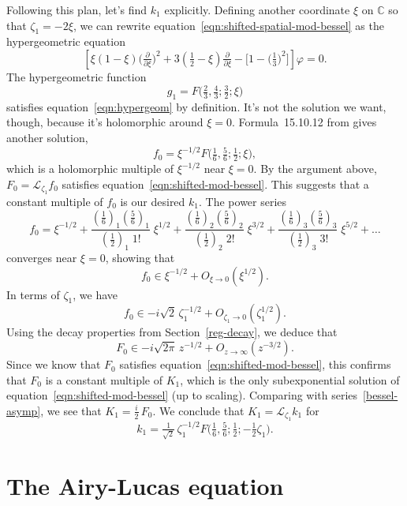 \documentclass{article}
\theoremstyle{plain}
\newcommand{\C}{\mathbb{C}}
\newcommand{\laplace}{\mathcal{L}}
\begin{document}
Following this plan, let's find $k_1$ explicitly. Defining another coordinate $\xi$ on $\C$ so that $\zeta_1 = -2\xi$, we can rewrite equation~\ref{eqn:shifted-spatial-mod-bessel} as the hypergeometric equation
\begin{equation}\label{eqn:hypergeom}
\left[\xi(1 - \xi) \big(\tfrac{\partial}{\partial \xi}\big)^2 + 3(\tfrac{1}{2} - \xi) \tfrac{\partial}{\partial \xi} - \big[1 - \big(\tfrac{1}{3}\big)^2\big]\right] \varphi = 0.
\end{equation}
The hypergeometric function
\[ g_1 = F\big(\tfrac{2}{3}, \tfrac{4}{3}; \tfrac{3}{2}; \xi\big) \]
satisfies equation~\ref{eqn:hypergeom} by definition. It's not the solution we want, though, because it's holomorphic around $\xi = 0$. Formula~15.10.12 from \cite{dlmf} gives another solution,
\[ f_0 = \xi^{-1/2} F\big(\tfrac{1}{6}, \tfrac{5}{6}; \tfrac{1}{2}; \xi\big), \]
which is a holomorphic multiple of $\xi^{-1/2}$ near $\xi = 0$. By the argument above, $F_0 = \laplace_{\zeta_1} f_0$ satisfies equation~\ref{eqn:shifted-mod-bessel}. This suggests that a constant multiple of $f_0$ is our desired $k_1$. The power series~\cite[equation~15.2.1]{dlmf}
\[ f_0 = \xi^{-1/2} + \frac{(\tfrac{1}{6})_1 (\tfrac{5}{6})_1}{(\tfrac{1}{2})_1 \; 1!}\;\xi^{1/2} + \frac{(\tfrac{1}{6})_2 (\tfrac{5}{6})_2}{(\tfrac{1}{2})_2 \; 2!}\;\xi^{3/2} + \frac{(\tfrac{1}{6})_3 (\tfrac{5}{6})_3}{(\tfrac{1}{2})_3 \; 3!}\;\xi^{5/2} + \ldots \]
converges near $\xi = 0$, showing that
\[ f_0 \in \xi^{-1/2} + O_{\xi \to 0}(\xi^{1/2}). \]
In terms of $\zeta_1$, we have
\[ f_0 \in -i \sqrt{2}\,\zeta_1^{-1/2} + O_{\zeta_1 \to 0}(\zeta_1^{1/2}). \]
Using the decay properties from Section~\ref{reg-decay}, we deduce that
\[ F_0 \in -i \sqrt{2\pi}\,z^{-1/2} + O_{z \to \infty}(z^{-3/2}). \]
Since we know that $F_0$ satisfies equation~\ref{eqn:shifted-mod-bessel}, this confirms that $F_0$ is a constant multiple of $K_1$, which is the only subexponential solution of equation~\ref{eqn:shifted-mod-bessel} (up to scaling). Comparing with series~\ref{bessel-asymp}, we see that $K_1 = \tfrac{i}{2}\,F_0$. We conclude that $K_1 = \laplace_{\zeta_1} k_1$ for
\[ k_1 = \tfrac{1}{\sqrt{2}}\,\zeta_1^{-1/2} F\big(\tfrac{1}{6}, \tfrac{5}{6}; \tfrac{1}{2}; -\tfrac{1}{2}\zeta_1\big). \]
\color{black}
\section{The Airy-Lucas equation}
\end{document}
